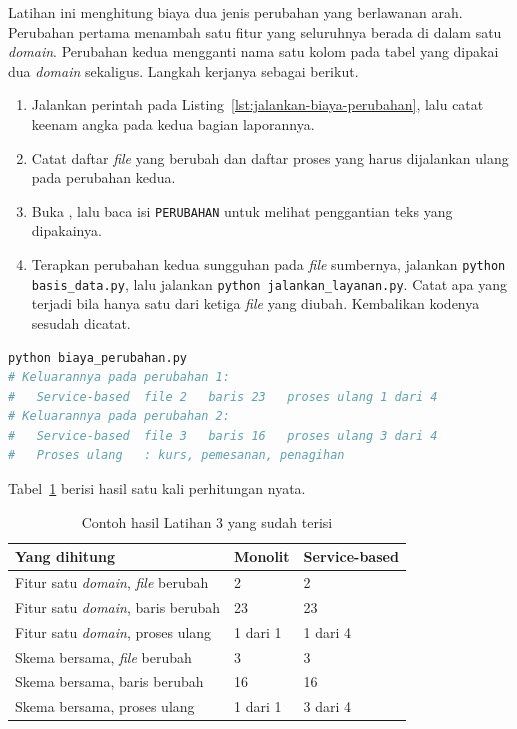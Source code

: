Latihan ini menghitung biaya dua jenis perubahan yang berlawanan arah.
Perubahan pertama menambah satu fitur yang seluruhnya berada di dalam satu
\textit{domain}. Perubahan kedua mengganti nama satu kolom pada tabel yang dipakai dua
\textit{domain} sekaligus. Langkah kerjanya sebagai berikut.

\begin{enumerate}
  \item Jalankan perintah pada Listing~\ref{lst:jalankan-biaya-perubahan}, lalu
    catat keenam angka pada kedua bagian laporannya.
  \item Catat daftar \textit{file} yang berubah dan daftar proses yang harus
    dijalankan ulang pada perubahan kedua.
  \item Buka , lalu baca isi
    \texttt{PERUBAHAN} untuk melihat penggantian teks yang dipakainya.
  \item Terapkan perubahan kedua sungguhan pada \textit{file} sumbernya, jalankan
    \texttt{python basis\_data.py}, lalu jalankan
    \texttt{python jalankan\_layanan.py}. Catat apa yang terjadi bila hanya
    satu dari ketiga \textit{file} yang diubah. Kembalikan kodenya sesudah dicatat.
\end{enumerate}

\begin{lstlisting}[language=bash, caption={Menghitung biaya dua jenis
  perubahan, skrip tersedia di \berkas{sources/chapter11/biaya_perubahan.py}},
  label=lst:jalankan-biaya-perubahan]
python biaya_perubahan.py
# Keluarannya pada perubahan 1:
#   Service-based  file 2   baris 23   proses ulang 1 dari 4
# Keluarannya pada perubahan 2:
#   Service-based  file 3   baris 16   proses ulang 3 dari 4
#   Proses ulang   : kurs, pemesanan, penagihan
\end{lstlisting}

Tabel~\ref{tab:lat3layanan-contoh} berisi hasil satu kali perhitungan nyata.

\begin{table}[htbp]
  \centering
  \caption{Contoh hasil Latihan 3 yang sudah terisi}
  \label{tab:lat3layanan-contoh}
  \begin{tabularx}{\textwidth}{|X|l|l|}
    \hline
    \textbf{Yang dihitung} & \textbf{Monolit} & \textbf{Service-based} \\
    \hline
    Fitur satu \textit{domain}, \textit{file} berubah & 2 & 2 \\
    \hline
    Fitur satu \textit{domain}, baris berubah & 23 & 23 \\
    \hline
    Fitur satu \textit{domain}, proses ulang & 1 dari 1 & 1 dari 4 \\
    \hline
    Skema bersama, \textit{file} berubah & 3 & 3 \\
    \hline
    Skema bersama, baris berubah & 16 & 16 \\
    \hline
    Skema bersama, proses ulang & 1 dari 1 & 3 dari 4 \\
    \hline
  \end{tabularx}
\end{table}

